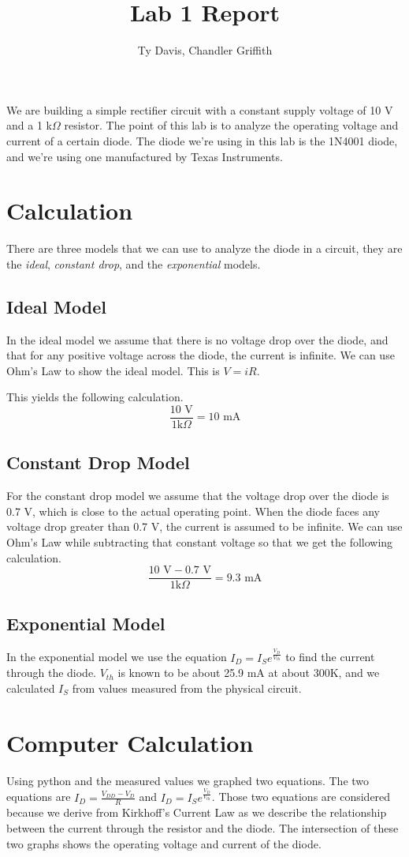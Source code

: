 \documentclass{article}
\title{Lab 1 Report}
\author{Ty Davis, Chandler Griffith}
\begin{document}
\maketitle
We are building a simple rectifier circuit with a constant supply
voltage of 10 V and a 1 k$\Omega$ resistor. The point of this lab
is to analyze the operating voltage and current of a certain diode.
The diode we're using in this lab is the 1N4001 diode, and we're using
one manufactured by Texas Instruments.

\section{Calculation}
There are three models that we can use to analyze the diode in a 
circuit, they are the \emph{ideal}, \emph{constant drop}, and the
\emph{exponential} models.
\subsection{Ideal Model}
In the ideal model we assume that there is no voltage drop over
the diode, and that for any positive voltage across the diode, the
current is infinite.
We can use Ohm's Law to show the ideal model. This is $V=iR$.

This yields the following calculation. 
$$\frac{10 \textrm{ V}}{1 \textrm{k}\Omega} = 10 \textrm{ mA}$$
\subsection{Constant Drop Model}
For the constant drop model we assume that the voltage drop over the diode
is 0.7 V, which is close to the actual operating point. When the diode 
faces any voltage drop greater than 0.7 V, the current is assumed 
to be infinite.
We can use Ohm's Law while subtracting that constant voltage so 
that we get the following calculation.
$$\frac{10 \textrm{ V} - 0.7 \textrm{ V}}{1 \textrm{k}\Omega} = 9.3 \textrm{ mA}$$

\subsection{Exponential Model}
In the exponential model we use the equation $I_D=I_S e^{\frac{V_D}{V_{th}}}$ to find
the current through the diode. $V_{th}$ is known to be about 25.9 mA 
at about 300K, and we calculated $I_S$ from values measured from the 
physical circuit.

\section{Computer Calculation}
Using python and the measured values we graphed two equations. The 
two equations are $I_D = \frac{V_{DD} - V_D}{R}$ and $I_D = I_S e^{\frac{V_D}{V_{th}}}$. 
Those two equations are considered because we derive from Kirkhoff's 
Current Law as we describe the relationship between the current through
the resistor and the diode. The intersection of these two graphs shows the 
operating voltage and current of the diode.
\end{document}
